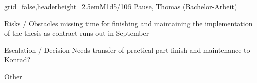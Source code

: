 \documentclass[english]{kiesgrube}
\begin{document}
\begin{poster}{grid=false,headerheight=2.5em}{}{M1d5/106 Pause, Thomas (Bachelor-Arbeit)}{}{}
\begin{posterbox}[name=risks,column=1,below=open]{Risks / Obstacles}
missing time for finishing and maintaining the implementation of the thesis as contract runs out in September
\end{posterbox}
\begin{posterbox}[name=escalation,column=1,below=risks]{Escalation / Decision Needs}
transfer of practical part finish and maintenance to Konrad?
\end{posterbox}
\begin{posterbox}[name=other,column=1,below=escalation]{Other}
\end{posterbox}
\footer{}
\end{poster}

\newpage
\end{document}
